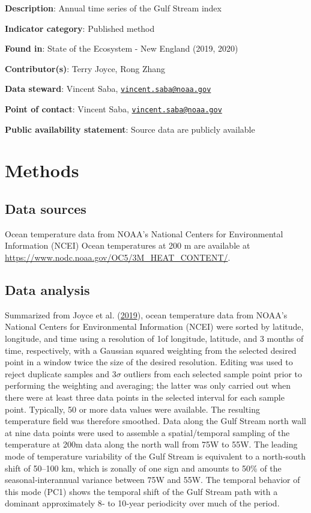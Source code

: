 \documentclass[
]{book}
\begin{document}
\textbf{Description}: Annual time series of the Gulf Stream index

\textbf{Indicator category}: Published method

\textbf{Found in}: State of the Ecosystem - New England (2019, 2020)

\textbf{Contributor(s)}: Terry Joyce, Rong Zhang

\textbf{Data steward}: Vincent Saba, \href{mailto:vincent.saba@noaa.gov}{\nolinkurl{vincent.saba@noaa.gov}}

\textbf{Point of contact}: Vincent Saba, \href{mailto:vincent.saba@noaa.gov}{\nolinkurl{vincent.saba@noaa.gov}}

\textbf{Public availability statement}: Source data are publicly available

\hypertarget{methods-15}{%
\section{Methods}\label{methods-15}}

\hypertarget{data-sources-15}{%
\subsection{Data sources}\label{data-sources-15}}

Ocean temperature data from NOAA's National Centers for Environmental Information (NCEI) Ocean temperatures at 200 m are available at \url{https://www.nodc.noaa.gov/OC5/3M_HEAT_CONTENT/}.

\hypertarget{data-analysis-14}{%
\subsection{Data analysis}\label{data-analysis-14}}

Summarized from Joyce et al. (\protect\hyperlink{ref-joyce2019}{2019}), ocean temperature data from NOAA's National Centers for Environmental Information (NCEI) were sorted by latitude, longitude, and time using a resolution of 1\textdegree of longitude, latitude, and 3 months of time, respectively, with a Gaussian squared weighting from the selected desired point in a window twice the size of the desired resolution. Editing was used to reject duplicate samples and 3\(\sigma\) outliers from each selected sample point prior to performing the weighting and averaging; the latter was only carried out when there were at least three data points in the selected interval for each sample point. Typically, 50 or more data values were available. The resulting temperature field was therefore smoothed. Data along the Gulf Stream north wall at nine data points were used to assemble a spatial/temporal sampling of the temperature at 200m data along the north wall from 75\textdegree W to 55\textdegree W. The leading mode of temperature variability of the Gulf Stream is equivalent to a north‐south shift of 50--100 km, which is zonally of one sign and amounts to 50\% of the seasonal‐interannual variance between 75\textdegree W and 55\textdegree W. The temporal behavior of this mode (PC1) shows the temporal shift of the Gulf Stream path with a dominant approximately 8‐ to 10‐year periodicity over much of the period.
\end{document}
